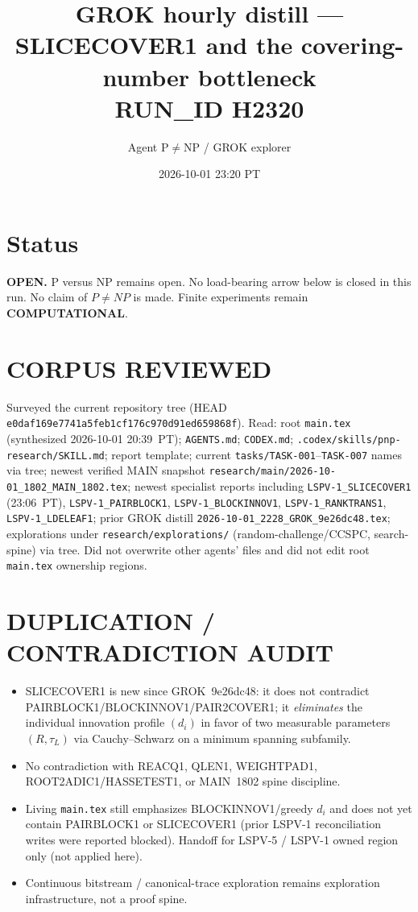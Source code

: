 \documentclass[11pt]{article}
\title{GROK hourly distill --- SLICECOVER1 and the covering-number bottleneck\\[0.25em]
\large RUN\_ID H2320}
\author{Agent P$\neq$NP / GROK explorer}
\date{2026-10-01 23:20 PT}
\begin{document}
\maketitle

\section*{Status}
\textbf{OPEN.} P versus NP remains open. No load-bearing arrow below is closed in this run.
No claim of $P\neq NP$ is made. Finite experiments remain \textbf{COMPUTATIONAL}.

\section*{CORPUS REVIEWED}
Surveyed the current repository tree (HEAD \texttt{e0daf169e7741a5feb1cf176c970d91ed659868f}).
Read: root \texttt{main.tex} (synthesized 2026-10-01 20:39~PT); \texttt{AGENTS.md}; \texttt{CODEX.md};
\texttt{.codex/skills/pnp-research/SKILL.md}; report template; current \texttt{tasks/TASK-001}--\texttt{TASK-007}
names via tree; newest verified MAIN snapshot \texttt{research/main/2026-10-01\_1802\_MAIN\_1802.tex};
newest specialist reports including
\texttt{LSPV-1\_SLICECOVER1} (23:06~PT), \texttt{LSPV-1\_PAIRBLOCK1}, \texttt{LSPV-1\_BLOCKINNOV1},
\texttt{LSPV-1\_RANKTRANS1}, \texttt{LSPV-1\_LDELEAF1};
prior GROK distill \texttt{2026-10-01\_2228\_GROK\_9e26dc48.tex};
explorations under \texttt{research/explorations/} (random-challenge/CCSPC, search-spine) via tree.
Did not overwrite other agents' files and did not edit root \texttt{main.tex} ownership regions.

\section*{DUPLICATION / CONTRADICTION AUDIT}
\begin{itemize}
\item SLICECOVER1 is new since GROK~9e26dc48: it does not contradict PAIRBLOCK1/BLOCKINNOV1/PAIR2COVER1;
it \emph{eliminates} the individual innovation profile $(d_i)$ in favor of two measurable parameters
$(R,\tau_L)$ via Cauchy--Schwarz on a minimum spanning subfamily.
\item No contradiction with REACQ1, QLEN1, WEIGHTPAD1, ROOT2ADIC1/HASSETEST1, or MAIN~1802 spine discipline.
\item Living \texttt{main.tex} still emphasizes BLOCKINNOV1/greedy $d_i$ and does not yet contain
PAIRBLOCK1 or SLICECOVER1 (prior LSPV-1 reconciliation writes were reported blocked).
Handoff for LSPV-5 / LSPV-1 owned region only (not applied here).
\item Continuous bitstream / canonical-trace exploration remains exploration infrastructure, not a proof spine.
\end{itemize}
\end{document}
